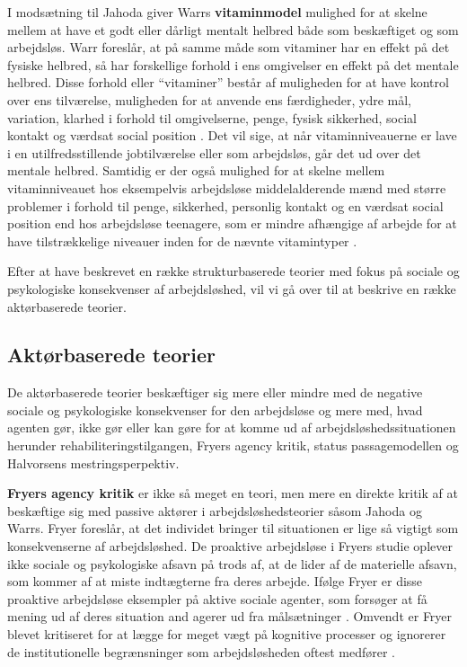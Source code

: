 I modsætning til Jahoda giver Warrs \textbf{vitaminmodel} mulighed for at skelne mellem at have et godt eller dårligt mentalt helbred både som beskæftiget og som arbejdsløs. Warr foreslår, at på samme måde som vitaminer har en effekt på det fysiske helbred, så har forskellige forhold i ens omgivelser en effekt på det mentale helbred. Disse forhold eller “vitaminer” består af muligheden for at have kontrol over ens tilværelse, muligheden for at anvende ens færdigheder, ydre mål, variation, klarhed i forhold til omgivelserne, penge, fysisk sikkerhed, social kontakt og værdsat social position \parencite[45]{Ezzy1993}. Det vil sige, at når vitaminniveauerne er lave i en utilfredsstillende jobtilværelse eller som arbejdsløs, går det ud over det mentale helbred. Samtidig er der også mulighed for at skelne mellem vitaminniveauet hos eksempelvis arbejdsløse middelalderende mænd med større problemer i forhold til penge, sikkerhed, personlig kontakt og en værdsat social position end hos arbejdsløse teenagere, som er mindre afhængige af arbejde for at have tilstrækkelige niveauer inden for de nævnte vitamintyper \parencite[46]{Ezzy1993}. %

Efter at have beskrevet en række strukturbaserede teorier med fokus på sociale og psykologiske konsekvenser af arbejdsløshed, vil vi gå over til at beskrive en række aktørbaserede teorier.


\subsection{Aktørbaserede teorier}

De aktørbaserede teorier beskæftiger sig mere eller mindre med de negative sociale og psykologiske konsekvenser for den arbejdsløse og mere med, hvad agenten gør, ikke gør eller kan gøre for at komme ud af arbejdsløshedssituationen herunder rehabiliteringstilgangen, Fryers agency kritik, status passagemodellen og Halvorsens mestringsperpektiv. %

\textbf{Fryers agency kritik} er ikke så meget en teori, men mere en direkte kritik af at beskæftige sig med passive aktører i arbejdsløshedsteorier såsom Jahoda og Warrs. Fryer foreslår, at det individet bringer til situationen er lige så vigtigt som konsekvenserne af arbejdsløshed. De proaktive arbejdsløse i Fryers studie oplever ikke sociale og psykologiske afsavn på trods af, at de lider af de materielle afsavn, som kommer af at miste indtægterne fra deres arbejde. Ifølge Fryer er disse proaktive arbejdsløse eksempler på aktive sociale agenter, som forsøger at få mening ud af deres situation and agerer ud fra målsætninger \parencite[47]{Ezzy1993}. Omvendt er Fryer blevet kritiseret for at lægge for meget vægt på kognitive processer og ignorerer de institutionelle begrænsninger som arbejdsløsheden oftest medfører \parencite[47]{Ezzy1993}.

